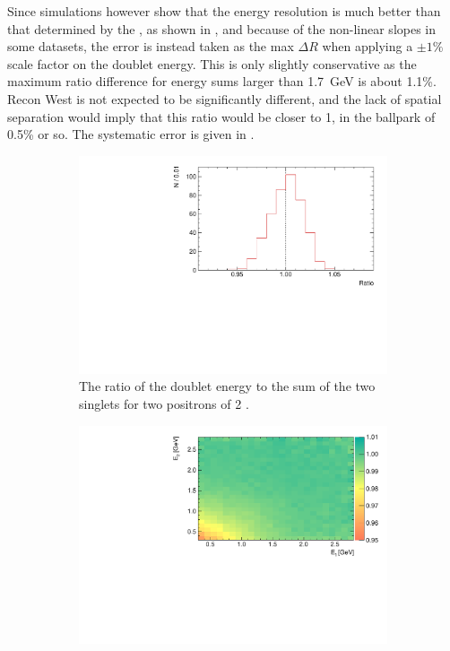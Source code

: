 Since simulations however show that the energy resolution is much better than that determined by the \chisq, as shown in , and because of the non-linear slopes in some datasets, the error is instead taken as the max $\Delta R$ when applying a $\pm1\%$ scale factor on the doublet energy. This is only slightly conservative as the maximum ratio difference for energy sums larger than \SI{1.7}{\GeV} is about 1.1\%. Recon West is not expected to be significantly different, and the lack of spatial separation would imply that this ratio would be closer to 1, in the ballpark of 0.5\% or so. The systematic error is given in .


\begin{figure}[h]
\centering
    \begin{subfigure}[t]{0.45\textwidth}
        \centering
        \includegraphics[width=\textwidth]{p_ratio_2_2_hist}
        \caption{The ratio of the doublet energy to the sum of the two singlets for two positrons of 2 \GeV.}
    \end{subfigure}%
    \hspace{1cm}
    \begin{subfigure}[t]{0.45\textwidth}
        \centering
        \includegraphics[width=\textwidth]{p_ratio_e1_e2}

\end{subfigure}
\end{figure}
